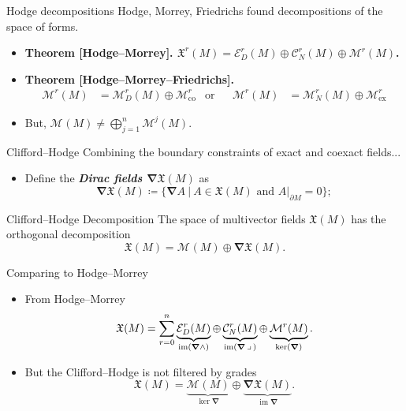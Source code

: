 \documentclass[aspectratio=169]{beamer}
\newcommand\boldgreen[1]{\textcolor{lighter_csu_green}{\emph{\textbf{#1}}}}
\newcommand\boldgold[1]{\textcolor{csu_gold}{\textbf{#1}}}
\newcommand{\im}{\operatorname{im}}
\newcommand{\grad}{\boldsymbol{\nabla}}
\newcommand{\monogenics}{\mathcal{M}}
\newcommand{\boundary}{{\partial M}}
\newcommand{\contract}{\hspace*{.5mm} \lrcorner \hspace*{.5mm}}
\newcommand{\monogenicfields}[1]{\mathcal{M}^{#1}(M)}
\newcommand{\smoothfields}{\mathfrak{X}}
\begin{document}
\begin{frame}{Hodge decompositions}
\vfill
Hodge, Morrey, Friedrichs found decompositions of the space of forms.
\begin{itemize}
  \pause
  \item \boldgold{Theorem [Hodge--Morrey]. $\smoothfields^r(M) = \mathcal{E}_D^r(M) \oplus \mathcal{C}_N^r(M) \oplus \monogenics^r(M)$.}
  \pause
  \item \boldgold{Theorem [Hodge--Morrey--Friedrichs].
  \begin{align*}
  \monogenics^r(M) &= \monogenics^r_D(M) \oplus \monogenics^r_{\textrm{co}} &\textrm{or} && \monogenics^r(M) &= \monogenics^r_N(M) \oplus \monogenics^r_{\textrm{ex}}
  \end{align*}
  }
  \pause
  \item \textcolor{dull_red}{But, $\monogenicfields{} \neq \bigoplus_{j=1}^n \monogenicfields{j}$.}
\end{itemize}
\vfill
\end{frame}

\begin{frame}{Clifford--Hodge}
\vfill
Combining the boundary constraints of exact and coexact fields...
\begin{itemize}
  \pause
  \item Define the \boldgreen{Dirac fields $\grad \smoothfields(M)$} as
  \[
      \grad \smoothfields(M) \coloneqq \{ \grad A ~\vert~ A \in \smoothfields(M) \textrm{~and~} A\vert_\boundary = 0\};
  \]
\end{itemize}
\pause
\begin{thm*}{Clifford--Hodge Decomposition}{}
The space of multivector fields $\smoothfields(M)$ has the orthogonal decomposition
\[
\smoothfields(M) = \monogenicfields{} \oplus \grad \smoothfields(M).
\]
\end{thm*}
\vfill
\end{frame}


\begin{frame}{Comparing to Hodge--Morrey}
\vfill
\begin{itemize}
\pause
\item From Hodge--Morrey
\[
\smoothfields(M) = \sum_{r=0}^n \underbrace{\mathcal{E}_D^r(M)}_{\operatorname{im}(\grad \wedge)} \oplus \underbrace{\mathcal{C}_N^r(M)}_{\operatorname{im}(\grad \contract)} \oplus \underbrace{\mathcal{M}^r(M)}_{\operatorname{ker}(\grad)}.
\]
\pause
\item But the Clifford--Hodge is not filtered by grades
\[
\smoothfields(M) = \underbrace{\monogenicfields{}}_{\ker \grad} \oplus \underbrace{\grad \smoothfields(M)}_{\im \grad}.
\]
\end{itemize}
\vfill
\end{frame}
\end{document}
